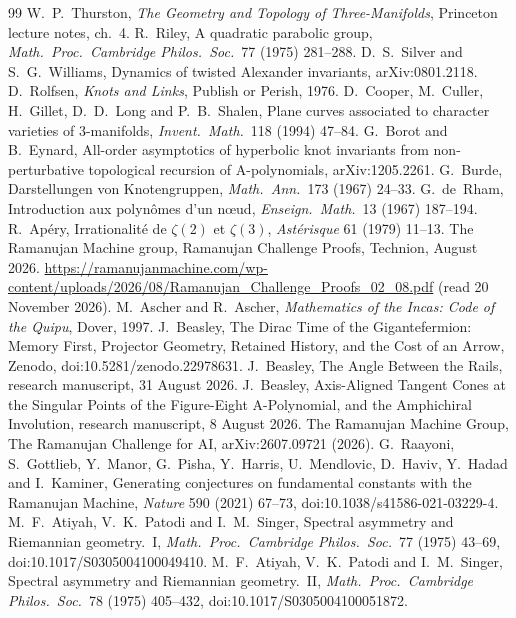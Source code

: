 \documentclass[11pt]{article}
\theoremstyle{definition}
\newcommand{\dtag}[1]{#1}
\begin{document}
\clearpage
\begin{thebibliography}{99}\small
{} W.~P.~Thurston, \emph{The Geometry and Topology of Three-Manifolds}, Princeton lecture notes, ch.~4.
 R.~Riley, A quadratic parabolic group, \emph{Math.\ Proc.\ Cambridge Philos.\ Soc.}\ 77 (1975) 281--288.
 D.~S.~Silver and S.~G.~Williams, Dynamics of twisted Alexander invariants, arXiv:0801.2118.
 D.~Rolfsen, \emph{Knots and Links}, Publish or Perish, 1976.
 D.~Cooper, M.~Culler, H.~Gillet, D.~D.~Long and P.~B.~Shalen, Plane curves associated to character varieties of 3-manifolds, \emph{Invent.\ Math.}\ 118 (1994) 47--84.
 G.~Borot and B.~Eynard, All-order asymptotics of hyperbolic knot invariants from non-perturbative topological recursion of A-polynomials, arXiv:1205.2261.
 G.~Burde, Darstellungen von Knotengruppen, \emph{Math.\ Ann.}\ 173 (1967) 24--33.
 G.~de~Rham, Introduction aux polyn\^omes d'un n\oe ud, \emph{Enseign.\ Math.}\ 13 (1967) 187--194.
 R.~Ap\'ery, Irrationalit\'e de $\zeta(2)$ et $\zeta(3)$, \emph{Ast\'erisque} 61 (1979) 11--13.
 The Ramanujan Machine group, Ramanujan Challenge Proofs, Technion, August 2026.\dtag{ \url{https://ramanujanmachine.com/wp-content/uploads/2026/08/Ramanujan_Challenge_Proofs_02_08.pdf} (read 20 November 2026).}
 M.~Ascher and R.~Ascher, \emph{Mathematics of the Incas: Code of the Quipu}, Dover, 1997.
 J.~Beasley, The Dirac Time of the Gigantefermion: Memory First, Projector Geometry, Retained History, and the Cost of an Arrow, Zenodo, doi:10.5281/zenodo.22978631.
 J.~Beasley, The Angle Between the Rails, research manuscript, 31 August 2026.
 J.~Beasley, Axis-Aligned Tangent Cones at the Singular Points of the Figure-Eight A-Polynomial, and the Amphichiral Involution, research manuscript, 8 August 2026.
 The Ramanujan Machine Group, The Ramanujan Challenge for AI, arXiv:2607.09721 (2026).
 G.~Raayoni, S.~Gottlieb, Y.~Manor, G.~Pisha, Y.~Harris, U.~Mendlovic, D.~Haviv, Y.~Hadad and I.~Kaminer, Generating conjectures on fundamental constants with the Ramanujan Machine, \emph{Nature} 590 (2021) 67--73, doi:10.1038/s41586-021-03229-4.
 M.~F.~Atiyah, V.~K.~Patodi and I.~M.~Singer, Spectral asymmetry and Riemannian geometry.~I, \emph{Math.\ Proc.\ Cambridge Philos.\ Soc.}\ 77 (1975) 43--69, doi:10.1017/S0305004100049410.
 M.~F.~Atiyah, V.~K.~Patodi and I.~M.~Singer, Spectral asymmetry and Riemannian geometry.~II, \emph{Math.\ Proc.\ Cambridge Philos.\ Soc.}\ 78 (1975) 405--432, doi:10.1017/S0305004100051872.

\end{thebibliography}
\end{document}
